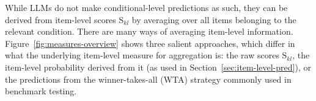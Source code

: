 \documentclass[fleqn]{article}
\begin{document}
While LLMs do not make conditional-level predictions as such, they can be derived from item-level scores $\text{S}_{kl}$ by averaging over all items belonging to the relevant condition.
There are many ways of averaging item-level information.
Figure~\ref{fig:measures-overview} shows three salient approaches, which differ in what the underlying item-level measure for aggregation is: the raw scores $\text{S}_{kl}$, the item-level probability derived from it (as used in Section~\ref{sec:item-level-pred}), or the predictions from the winner-takes-all (WTA) strategy commonly used in benchmark testing.

\end{document}
